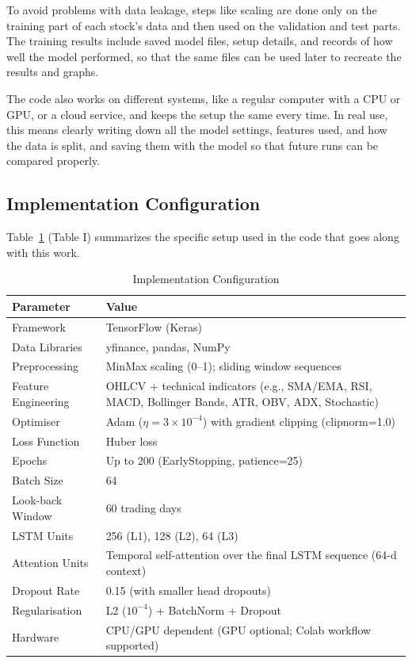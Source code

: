 \documentclass[conference]{IEEEtran}
\begin{document}
To avoid problems with data leakage, steps like scaling are done only on the training part of each stock's data and then used on the validation and test parts. The training results include saved model files, setup details, and records of how well the model performed, so that the same files can be used later to recreate the results and graphs.

The code also works on different systems, like a regular computer with a CPU or GPU, or a cloud service, and keeps the setup the same every time. In real use, this means clearly writing down all the model settings, features used, and how the data is split, and saving them with the model so that future runs can be compared properly.

\subsection{Implementation Configuration}

Table~\ref{tab:impl_config} (Table I) summarizes the specific setup used in the code that goes along with this work.

\begin{table}[htbp]
\caption{Implementation Configuration}
\label{tab:impl_config}
\begin{center}
\small
\begin{tabular}{@{}p{}p{}@{}}
\toprule
\textbf{Parameter} & \textbf{Value} \\
\midrule
Framework & TensorFlow (Keras) \\
Data Libraries & yfinance, pandas, NumPy \\
Preprocessing & MinMax scaling (0--1); sliding window sequences \\
Feature Engineering & OHLCV + technical indicators (e.g., SMA/EMA, RSI, MACD, Bollinger Bands, ATR, OBV, ADX, Stochastic) \\
Optimiser & Adam ($\eta = 3\times 10^{-4}$) with gradient clipping (clipnorm=1.0) \\
Loss Function & Huber loss \\
Epochs & Up to 200 (EarlyStopping, patience=25) \\
Batch Size & 64 \\
Look-back Window & 60 trading days \\
LSTM Units & 256 (L1), 128 (L2), 64 (L3) \\
Attention Units & Temporal self-attention over the final LSTM sequence (64-d context) \\
Dropout Rate & 0.15 (with smaller head dropouts) \\
Regularisation & L2 ($10^{-4}$) + BatchNorm + Dropout \\
Hardware & CPU/GPU dependent (GPU optional; Colab workflow supported) \\
\bottomrule
\end{tabular}
\end{center}
\end{table}
\end{document}
